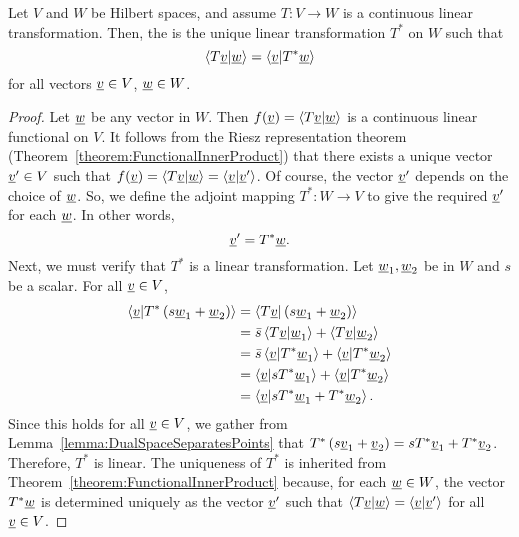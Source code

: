 \begin{theorem}
Let $V$ and $W$ be Hilbert spaces, and assume $T \colon V \rightarrow W$ is a continuous linear transformation.
Then, the  is the unique linear transformation $T^*$ on $W$ such that
\begin{equation*}
\left\langle T \underline{v} | \underline{w} \right\rangle
= \left\langle \underline{v} | T^* \underline{w} \right\rangle
\end{equation*}
for all vectors $\underline{v} \in V$, $\underline{w} \in W$.
\end{theorem}
\begin{proof}
Let $\underline{w}$ be any vector in $W$.
Then $f(\underline{v}) = \left\langle T \underline{v} | \underline{w} \right\rangle$ is a continuous linear functional on $V$.
It follows from the Riesz representation theorem (Theorem~\ref{theorem:FunctionalInnerProduct}) that there exists a unique vector $\underline{v}' \in V$ such that $f(\underline{v}) = \left\langle T \underline{v} | \underline{w} \right\rangle = \left\langle \underline{v} | \underline{v}' \right\rangle$.
Of course, the vector $\underline{v}'$ depends on the choice of $\underline{w}$.
So, we define the adjoint mapping $T^* \colon W \rightarrow V$ to give the required $\underline{v}'$ for each $\underline{w}$.
In other words,
\begin{equation*}
\underline{v}' = T^* \underline{w} .
\end{equation*}
Next, we must verify that $T^*$ is a linear transformation.
Let $\underline{w}_1, \underline{w}_2$ be in $W$ and $s$ be a scalar.
For all $\underline{v} \in V$,
\begin{equation*}
\begin{split}
\left\langle \underline{v} | T^* \left( s \underline{w}_1 + \underline{w}_2 \right) \right\rangle
&= \left\langle T \underline{v} | \left( s \underline{w}_1 + \underline{w}_2 \right) \right\rangle \\
&= \bar{s} \left\langle T \underline{v} | \underline{w}_1 \right\rangle
+ \left\langle T \underline{v} | \underline{w}_2 \right\rangle \\
&= \bar{s} \left\langle \underline{v} | T^* \underline{w}_1 \right\rangle
+ \left\langle \underline{v} | T^* \underline{w}_2 \right\rangle \\
&= \left\langle \underline{v} | s T^* \underline{w}_1 \right\rangle
+ \left\langle \underline{v} | T^* \underline{w}_2 \right\rangle \\
&= \left\langle \underline{v} | s T^* \underline{w}_1 + T^* \underline{w}_2 \right\rangle .
\end{split}
\end{equation*}
Since this holds for all $\underline{v} \in V$, we gather from Lemma~\ref{lemma:DualSpaceSeparatesPoints} that $T^* \left( s \underline{v}_1 + \underline{v}_2 \right) = s T^* \underline{v}_1 + T^* \underline{v}_2$.
Therefore, $T^*$ is linear.
The uniqueness of $T^*$ is inherited from Theorem~\ref{theorem:FunctionalInnerProduct} because, for each $\underline{w}\in W$, the vector $T^* \underline{w}$ is determined uniquely as the vector $\underline{v}'$ such that $\left\langle T \underline{v} | \underline{w} \right\rangle = \left\langle \underline{v} | \underline{v}' \right\rangle$ for all $\underline{v} \in V$.
\end{proof}


